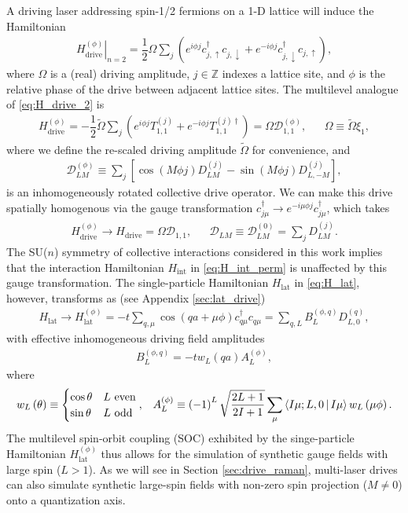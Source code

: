 \documentclass[nofootinbib,notitlepage,11pt]{revtex4-2}
\renewcommand{\t}{\text} %
\newcommand{\f}[2]{\dfrac{#1}{#2}} %
\newcommand{\p}[1]{\left(#1\right)} %
\renewcommand{\sp}[1]{\left[#1\right]} %
\newcommand{\bk}{\Braket} %
\newcommand{\1}{\mathds{1}}
\newcommand{\up}{\uparrow}
\newcommand{\dn}{\downarrow}
\newcommand{\D}{\mathcal{D}}
\begin{document}
A driving laser addressing spin-1/2 fermions on a 1-D lattice will
induce the Hamiltonian
\begin{align}
  \left. H_{\t{drive}}^{(\phi)} \right|_{n=2}
  = \f12 \Omega \sum_j
  \p{e^{i\phi j} c_{j,\up}^\dag c_{j,\dn}
    + e^{-i\phi j} c_{j,\dn}^\dag c_{j,\up}},
  \label{eq:H_drive_2}
\end{align}
where $\Omega$ is a (real) driving amplitude, $j\in\mathbb{Z}$ indexes
a lattice site, and $\phi$ is the relative phase of the drive between
adjacent lattice sites.  The multilevel analogue of
\eqref{eq:H_drive_2} is
\begin{align}
  H_{\t{drive}}^{(\phi)}
  = -\f12 \tilde\Omega \sum_j \p{e^{i\phi j} T_{1,1}^{(j)}
    + e^{-i\phi j} T_{1,1}^{(j)\dag}}
  = \Omega \D_{1,1}^{(\phi)},
  &&
  \Omega \equiv \tilde \Omega \xi_1,
  \label{eq:H_drive}
\end{align}
where we define the re-scaled driving amplitude $\tilde\Omega$ for
convenience, and
\begin{align}
  \D_{LM}^{(\phi)}
  \equiv \sum_j \sp{\cos\p{M\phi j} D_{LM}^{(j)}
    - \sin\p{M\phi j} D_{L,-M}^{(j)}},
  \label{eq:drive_rot}
\end{align}
is an inhomogeneously rotated collective drive operator.  We can make
this drive spatially homogenous via the gauge transformation
$c_{j\mu}^\dag \to e^{-i\mu\phi j} c_{j\mu}^\dag$, which takes
 \begin{align}
   H_{\t{drive}}^{(\phi)} \to H_{\t{drive}} = \Omega \D_{1,1},
   &&
   \D_{LM} \equiv \D_{LM}^{(0)} = \sum_j D_{LM}^{(j)}.
\end{align}
The SU($n$) symmetry of collective interactions considered in this
work implies that the interaction Hamiltonian $H_{\t{int}}$ in
\eqref{eq:H_int_perm} is unaffected by this gauge transformation.  The
single-particle Hamiltonian $H_{\t{lat}}$ in \eqref{eq:H_lat},
however, transforms as (see Appendix \ref{sec:lat_drive})
\begin{align}
  H_{\t{lat}}
  \to H_{\t{lat}}^{(\phi)}
  = -t \sum_{q,\mu} \cos\p{qa+\mu\phi} c_{q\mu}^\dag c_{q\mu}
  = \sum_{q,L} B_L^{(\phi,q)} D_{L,0}^{(q)},
  \label{eq:H_lat_SOC_B}
\end{align}
with effective inhomogeneous driving field amplitudes
\begin{align}
  B_L^{(\phi,q)} = -t w_L\p{qa} A_L^{(\phi)},
\end{align}
where
\begin{align}
  w_L\p{\theta} \equiv
  \begin{cases}
    \cos\theta & L~\t{even} \\
    \sin\theta & L~\t{odd}
  \end{cases},
  &&
  A_L^{(\phi)} \equiv \p{-1}^L \sqrt{\f{2L+1}{2I+1}}
  \sum_\mu \bk{I\mu;L,0|I\mu} w_L\p{\mu\phi}.
  \label{eq:A_L_phi}
\end{align}
The multilevel spin-orbit coupling (SOC) exhibited by the
singe-particle Hamiltonian $H_{\t{lat}}^{(\phi)}$ thus allows for the
simulation of synthetic gauge fields with large spin ($L>1$).  As we
will see in Section \ref{sec:drive_raman}, multi-laser drives can also
simulate synthetic large-spin fields with non-zero spin projection
($M\ne0$) onto a quantization axis.
\end{document}
